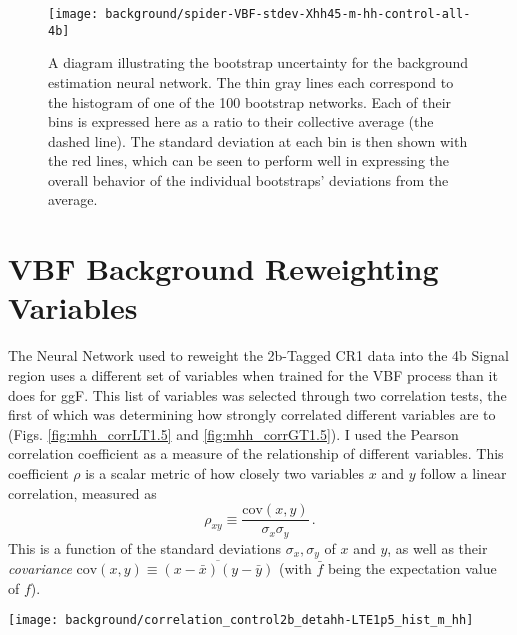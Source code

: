     \begin{figure}[tbh]
        \texttt{[image: background/spider-VBF-stdev-Xhh45-m-hh-control-all-4b]}
        \caption{
            A diagram illustrating the bootstrap uncertainty for the background estimation neural network.
            The thin gray lines each correspond to the \mhh histogram of one of the 100 bootstrap networks.
            Each of their bins is expressed here as a ratio to their collective average (the dashed line).
            The standard deviation at each bin is then shown with the red lines,
                which can be seen to perform well in expressing the overall behavior
                of the individual bootstraps' deviations from the average.
        }
        \label{fig:spider}
    \end{figure}



\FloatBarrier
\section{VBF Background Reweighting Variables} \label{sec:vbf_bgdNNRW}

    The Neural Network used to reweight the 2b-Tagged CR1 data into the 4b Signal region
        uses a different set of variables when trained for the VBF process than it does for ggF.
    This list of variables was selected through two correlation tests,
        the first of which was determining how strongly correlated different variables are to \mhh
        (Figs. \ref{fig:mhh_corrLT1.5} and \ref{fig:mhh_corrGT1.5}).
    I used the Pearson correlation coefficient as a measure of the relationship of different variables.
    This coefficient $\rho$ is a scalar metric of how closely
        two variables $x$ and $y$ follow a linear correlation, measured as
        \begin{equation}
            \rho_{xy} \equiv \frac{\textrm{cov}(x,y)}{\sigma_x \sigma_y}
            \,.
        \end{equation}
    This is a function of the standard deviations $\sigma_x,\sigma_y$ of $x$ and $y$,
        as well as their \textit{covariance} 
        $\textrm{cov}(x,y) \equiv \overline{(x-\bar{x})(y-\bar{y})}$
        (with $\bar{f}$ being the expectation value of $f$)\cite{pearson_correlation}.


    \begin{sidewaysfigure}[tbh]
        \vspace*{6.5in}
        \texttt{[image: background/correlation\_control2b\_detahh-LTE1p5\_hist\_m\_hh]}
        \caption{
            The Pearson Correlation Coefficients associated with \mhh for the 2b CR1 data,
                with $\deta \leq 1.5$.
            The higher up on the chart a variable is, the more strongly correlated it is to \mhh,
                with \mhh itself at the top with a coefficient of 1.
            Note that most of the VBF-specific variables, such as vbf\_mjj, are very poorly correlated to \mhh and thus not preferred.
        }
        \label{fig:mhh_corrLT1.5}
    \end{sidewaysfigure}

